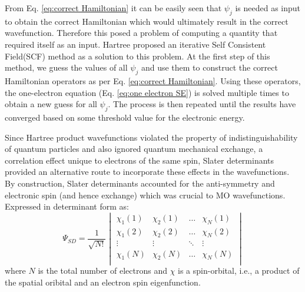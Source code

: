             From Eq. \eqref{eq:correct Hamiltonian} it can be easily seen that $\psi_j$ is needed as input to obtain the correct Hamiltonian which would ultimately result in the correct wavefunction. Therefore this posed a problem of computing a quantity that required itself as an input. Hartree proposed an iterative Self Consistent Field(SCF) method as a solution to this problem. At the first step of this method, we guess the values of all $\psi_j$ and use them to construct the correct Hamiltonian operators as per Eq. \eqref{eq:correct Hamiltonian}. Using these operators, the one-electron \Schrodinger{} equation (Eq. \eqref{eq:one electron SE}) is solved multiple times to obtain a new guess for all $\psi_j$. The process is then repeated until the results have converged based on some threshold value for the electronic energy.

            Since Hartree product wavefunctions violated the property of indistinguishability of quantum particles and also ignored quantum mechanical exchange, a correlation effect unique to electrons of the same spin, Slater determinants provided an alternative route to incorporate these effects in the wavefunctions. By construction, Slater determinants accounted for the anti-symmetry and electronic spin (and hence exchange) which was crucial to MO wavefunctions. Expressed in determinant form as:
            \begin{equation}\label{eq:Slater determinant}
                \Psi_{SD} = \frac{1}{\sqrt{N!}}
                \begin{vmatrix}
                    \chi_1 (1) & \chi_2 (1) & \ldots & \chi_N (1)\\
                    \chi_1 (2) & \chi_2 (2) & \ldots & \chi_N (2)\\
                    \vdots & \vdots & \ddots & \vdots\\
                    \chi_1 (N) & \chi_2 (N) & \ldots & \chi_N (N)\\
                \end{vmatrix}
            \end{equation}
            where $N$ is the total number of electrons and $\chi$ is a spin-orbital, i.e., a product of the spatial oribital and an electron spin eigenfunction.

